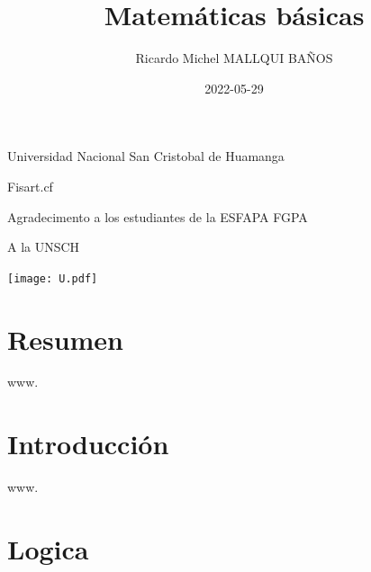 \documentclass[
  16pt,
]{krantz}
\title{Matemáticas básicas}
\author{Ricardo Michel MALLQUI BAÑOS}
\date{2022-05-29}
\theoremstyle{definition}
\theoremstyle{definition}
\theoremstyle{definition}
\theoremstyle{definition}
\theoremstyle{remark}
\begin{document}
\maketitle

\thispagestyle{empty}
\begin{flushright}
Universidad Nacional San Cristobal de Huamanga

Fisart.cf

Agradecimento a los estudiantes de la ESFAPA FGPA

A la UNSCH

\texttt{[image: U.pdf]}
\end{flushright}

{
\hypersetup{linkcolor=}
\setcounter{tocdepth}{2}
\tableofcontents
}
\listoftables
\listoffigures
\newcommand{\N}{\mathbb{N}}
\newcommand{\R}{\mathbb{R}}
\newcommand{\CC}{\mathbb{C}}
\newcommand{\I}{\mathbb{I}}
\newcommand{\f}{\mathbb{f}}
\newcommand{\X}{\mathbb{X}}
\newcommand{\D}{\mathbb{D}}
\newcommand{\Z}{\mathbb{Z}}
\newcommand{\Q}{\mathbb{Q}}
\newcommand{\norm}[1]{\left\Vert#1\right\Vert}
\newcommand{\abs}[1]{\left\vert#1\right\vert}
\newcommand{\set}[1]{\left\{#1\right\}}
\newcommand{\seq}[1]{\left<#1\right>}
\newcommand{\co}[1]{\left[#1\right]}
\newcommand{\cc}[1]{\left(#1\right)}
\newcommand{\J}{\mathcal{J}}
\newcommand{\K}{\mathcal{K}}
\newcommand{\M}{\mathcal{M}}
\newcommand{\F}{\mathcal{F}}

\hypertarget{resumen}{%
\chapter*{Resumen}\label{resumen}}


www.

\hypertarget{introducciuxf3n}{%
\chapter*{Introducción}\label{introducciuxf3n}}


www.

\mainmatter

\hypertarget{logica}{%
\chapter{Logica}\label{logica}}
\end{document}
